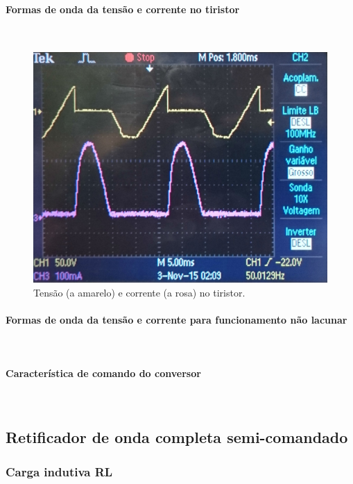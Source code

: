 \documentclass[a4paper,11pt]{article}
\numberwithin{equation}{section}
\begin{document}
\paragraph{Formas de onda da tensão e corrente no tiristor} \mbox{}\

\begin{figure}[H]
	\centering
	\includegraphics[keepaspectratio=true, scale=0.15]{img/DSC_0185}
	\caption{Tensão (a amarelo) e corrente (a rosa) no tiristor.}
	\label{fig:tctiristorlacuna}
	\vspace{-0.8em}
\end{figure}

\paragraph{Formas de onda da tensão e corrente para funcionamento não lacunar} \mbox{}\

\paragraph{Característica de comando do conversor} \mbox{}\

\subsection{Retificador de onda completa semi-comandado}

\subsubsection{Carga indutiva RL}
\end{document}
